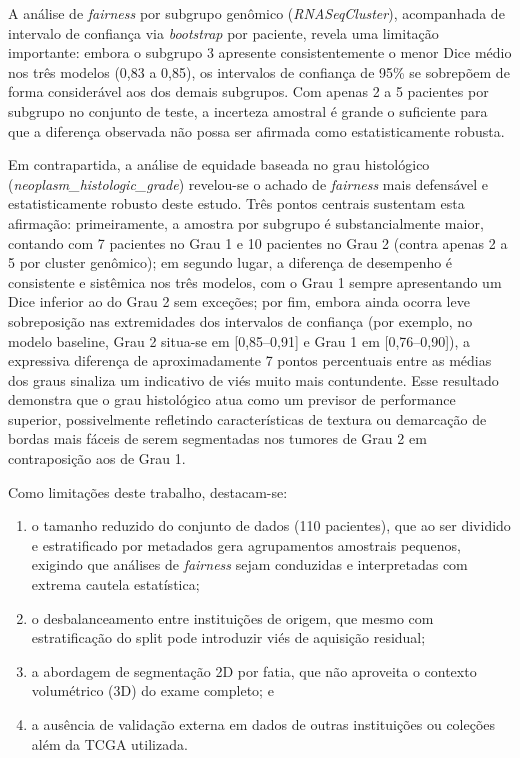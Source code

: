 \documentclass[conference]{IEEEtran}
\begin{document}
A análise de \textit{fairness} por subgrupo genômico (\textit{RNASeqCluster}), acompanhada de intervalo de confiança via \textit{bootstrap} por paciente, revela uma limitação importante: embora o subgrupo 3 apresente consistentemente o menor Dice médio nos três modelos (0,83 a 0,85), os intervalos de confiança de 95\% se sobrepõem de forma considerável aos dos demais subgrupos. Com apenas 2 a 5 pacientes por subgrupo no conjunto de teste, a incerteza amostral é grande o suficiente para que a diferença observada não possa ser afirmada como estatisticamente robusta.

Em contrapartida, a análise de equidade baseada no grau histológico (\textit{neoplasm\_histologic\_grade}) revelou-se o achado de \textit{fairness} mais defensável e estatisticamente robusto deste estudo. Três pontos centrais sustentam esta afirmação: primeiramente, a amostra por subgrupo é substancialmente maior, contando com 7 pacientes no Grau 1 e 10 pacientes no Grau 2 (contra apenas 2 a 5 por cluster genômico); em segundo lugar, a diferença de desempenho é consistente e sistêmica nos três modelos, com o Grau 1 sempre apresentando um Dice inferior ao do Grau 2 sem exceções; por fim, embora ainda ocorra leve sobreposição nas extremidades dos intervalos de confiança (por exemplo, no modelo baseline, Grau 2 situa-se em [0,85--0,91] e Grau 1 em [0,76--0,90]), a expressiva diferença de aproximadamente 7 pontos percentuais entre as médias dos graus sinaliza um indicativo de viés muito mais contundente. Esse resultado demonstra que o grau histológico atua como um previsor de performance superior, possivelmente refletindo características de textura ou demarcação de bordas mais fáceis de serem segmentadas nos tumores de Grau 2 em contraposição aos de Grau 1.

Como limitações deste trabalho, destacam-se:
\begin{enumerate}
    \item o tamanho reduzido do conjunto de dados (110 pacientes), que ao ser dividido e estratificado por metadados gera agrupamentos amostrais pequenos, exigindo que análises de \textit{fairness} sejam conduzidas e interpretadas com extrema cautela estatística;
    \item o desbalanceamento entre instituições de origem, que mesmo com estratificação do split pode introduzir viés de aquisição residual;
    \item a abordagem de segmentação 2D por fatia, que não aproveita o contexto volumétrico (3D) do exame completo; e
    \item a ausência de validação externa em dados de outras instituições ou coleções além da TCGA utilizada.
\end{enumerate}
\end{document}
